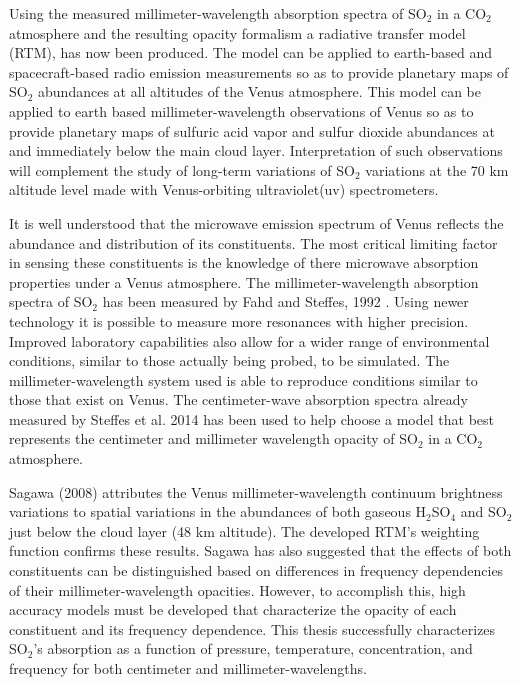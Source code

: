 Using the measured millimeter-wavelength absorption spectra of SO$_2$ in a CO$_2$ atmosphere and the resulting opacity formalism a radiative transfer model (RTM), has now been produced. The model can be applied to earth-based and spacecraft-based radio emission measurements so as to provide planetary maps of SO$_2$ abundances at all altitudes of the Venus atmosphere. %
This model can be applied to earth based millimeter-wavelength observations of Venus so as to provide planetary maps of sulfuric acid vapor and sulfur dioxide abundances at and immediately below the main cloud layer. Interpretation of such observations will complement the study of long-term variations of SO$_2$ variations at the 70 km altitude level made with Venus-orbiting ultraviolet(uv) spectrometers. 

It is well understood that the microwave emission spectrum of Venus reflects the abundance and distribution of its constituents. The most critical limiting factor in sensing these constituents is the knowledge of there microwave absorption properties under a Venus atmosphere. The millimeter-wavelength absorption spectra of SO$_2$ has been measured by Fahd and Steffes, 1992 \cite{Fahd-thesis}.  Using newer technology it is possible to measure more resonances with higher precision. Improved laboratory capabilities also allow for a wider range of environmental conditions, similar to those actually being probed, to be simulated. The millimeter-wavelength system used is able to reproduce conditions similar to those that exist on Venus. The centimeter-wave absorption spectra already measured by Steffes et al. 2014 \cite{Steffes-2014} has been used to help choose a model that best represents the centimeter and millimeter wavelength opacity of SO$_2$ in a CO$_2$ atmosphere. 

Sagawa (2008) attributes the Venus millimeter-wavelength continuum brightness variations to spatial variations in the abundances of both gaseous H$_2$SO$_4$ and SO$_2$ just below the cloud layer (48 km altitude). The developed RTM's weighting function confirms these results. Sagawa has also suggested that the effects of both constituents can be distinguished based on differences in frequency dependencies of their millimeter-wavelength opacities. However, to accomplish this, high accuracy models must be developed that characterize the opacity of each constituent and its frequency dependence. This thesis successfully characterizes SO$_2$'s absorption as a function of pressure, temperature, concentration, and frequency for both centimeter and millimeter-wavelengths. 


